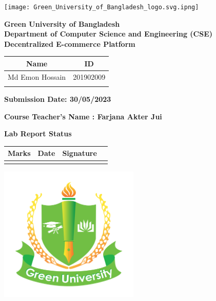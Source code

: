 \documentclass[a4paper,11pt]{article}
\begin{document}
\begin{center}


\texttt{[image: Green\_University\_of\_Bangladesh\_logo.svg.ipng]} 


\textbf{\normalsize{ Green University of Bangladesh}} \\
\textbf{\normalsize{Department of Computer Science and Engineering (CSE)}}\\[1cm]

\textbf{\LARGE{Decentralized E-commerce Platform}}\\[1cm]

\begin{table}[H]
    \centering
    \begin{tabular}{|c|c|} \hline
       \textbf{Name} &  \textbf{ID} \\ \hline
       Md Emon Hossain  & 201902009 \\ \hline
        & \\ \hline
       
    \end{tabular}
   
\end{table} 

\vspace{0.5cm}


 
\textbf{\large Submission Date: 30/05/2023}
\vspace{1cm}

\textbf{\large Course Teacher's Name : Farjana Akter Jui}

\begin{center}
\textbf{Lab Report Status}
\end{center}

\begin{table}[h]
\centering
\begin{tabular}{|p{4cm}|p{6cm}|p{4cm}|} \hline
\textbf{Marks} & \textbf{Date}& \textbf{Signature} \\ \hline  
                &              &                     
                   &              &                     \\ \hline


\end{tabular}
\end{table}

\newpage


\begin{center}

\includegraphics[width=0.5\textwidth]{Green_University_of_Bangladesh_logo.svg.png} 



\end{center}
\end{center}
\end{document}

